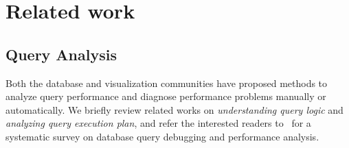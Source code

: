\section{Related work}
\subsection{Query Analysis}



Both the database and visualization communities have proposed methods to analyze query performance and diagnose performance problems manually or automatically. We briefly review related works on \textit{understanding query logic} and \textit{analyzing query execution plan}, and refer the interested readers to~\cite{gathani2020debugging} for a systematic survey on database query debugging and performance analysis.



